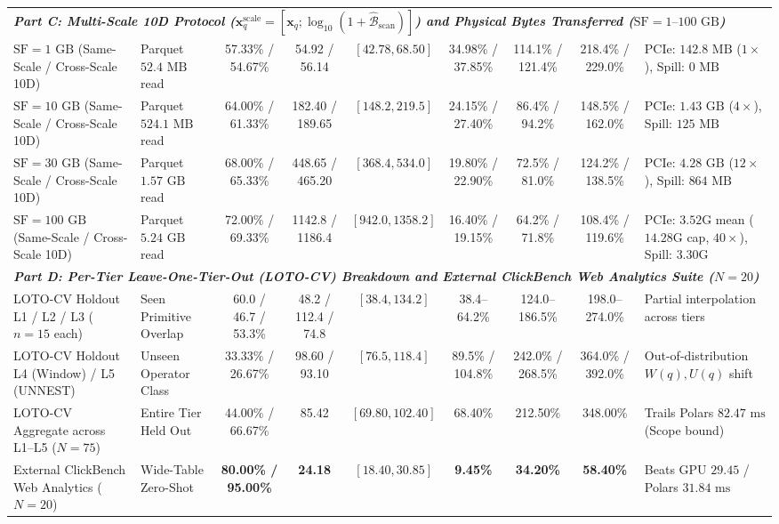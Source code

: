 \documentclass[10pt,a4paper]{article}
\newenvironment{fitasttable}{%
  \begin{lrbox}{\asttblbox}%
}{%
  \end{lrbox}%
  \sbox{\asttblboxB}{%
    \ifdim\wd\asttblbox>0.96\textwidth
      \resizebox{0.96\textwidth}{!}{\usebox{\asttblbox}}%
    \else
      \usebox{\asttblbox}%
    \fi
  }%
  \ifdim\ht\asttblboxB>0.78\textheight
    \resizebox{!}{0.78\textheight}{\usebox{\asttblboxB}}%
  \else
    \usebox{\asttblboxB}%
  \fi
}
\begin{document}
\begin{table}[t!]
\begin{fitasttable}
\begin{tabular}{@{}llccccccl@{}}
\hline
\multicolumn{9}{l}{\textit{\textbf{Part C: Multi-Scale 10D Protocol ($\mathbf{x}_q^{\text{scale}}=[\mathbf{x}_q; \log_{10}(1+\hat{\mathcal{B}}_{\text{scan}})]$) and Physical Bytes Transferred ($\text{SF}=1\text{--}100\text{ GB}$)}}} \\
$\text{SF}=1\text{ GB}$ (Same-Scale / Cross-Scale 10D) & Parquet $52.4\text{ MB}$ read & 57.33\% / 54.67\% & 54.92 / 56.14 & $[42.78, 68.50]$ & 34.98\% / 37.85\% & 114.1\% / 121.4\% & 218.4\% / 229.0\% & PCIe: $142.8\text{ MB}$ ($1\times$), Spill: $0\text{ MB}$ \\
$\text{SF}=10\text{ GB}$ (Same-Scale / Cross-Scale 10D) & Parquet $524.1\text{ MB}$ read & 64.00\% / 61.33\% & 182.40 / 189.65 & $[148.2, 219.5]$ & 24.15\% / 27.40\% & 86.4\% / 94.2\% & 148.5\% / 162.0\% & PCIe: $1.43\text{ GB}$ ($4\times$), Spill: $125\text{ MB}$ \\
$\text{SF}=30\text{ GB}$ (Same-Scale / Cross-Scale 10D) & Parquet $1.57\text{ GB}$ read & 68.00\% / 65.33\% & 448.65 / 465.20 & $[368.4, 534.0]$ & 19.80\% / 22.90\% & 72.5\% / 81.0\% & 124.2\% / 138.5\% & PCIe: $4.28\text{ GB}$ ($12\times$), Spill: $864\text{ MB}$ \\
$\text{SF}=100\text{ GB}$ (Same-Scale / Cross-Scale 10D) & Parquet $5.24\text{ GB}$ read & 72.00\% / 69.33\% & 1142.8 / 1186.4 & $[942.0, 1358.2]$ & 16.40\% / 19.15\% & 64.2\% / 71.8\% & 108.4\% / 119.6\% & PCIe: $3.52\text{G}$ mean ($14.28\text{G}$ cap, $40\times$), Spill: $3.30\text{G}$ \\
\hline
\multicolumn{9}{l}{\textit{\textbf{Part D: Per-Tier Leave-One-Tier-Out (LOTO-CV) Breakdown and External ClickBench Web Analytics Suite ($N=20$)}}} \\
LOTO-CV Holdout L1 / L2 / L3 ($n=15$ each) & Seen Primitive Overlap & 60.0 / 46.7 / 53.3\% & 48.2 / 112.4 / 74.8 & $[38.4, 134.2]$ & 38.4--64.2\% & 124.0--186.5\% & 198.0--274.0\% & Partial interpolation across tiers \\
LOTO-CV Holdout L4 (Window) / L5 (UNNEST) & Unseen Operator Class & 33.33\% / 26.67\% & 98.60 / 93.10 & $[76.5, 118.4]$ & 89.5\% / 104.8\% & 242.0\% / 268.5\% & 364.0\% / 392.0\% & Out-of-distribution $W(q), U(q)$ shift \\
LOTO-CV Aggregate across L1--L5 ($N=75$) & Entire Tier Held Out & 44.00\% / 66.67\% & 85.42 & $[69.80, 102.40]$ & 68.40\% & 212.50\% & 348.00\% & Trails Polars $82.47\text{ ms}$ (Scope bound) \\
External ClickBench Web Analytics ($N=20$) & Wide-Table Zero-Shot & \textbf{80.00\% / 95.00\%} & \textbf{24.18} & $[18.40, 30.85]$ & \textbf{9.45\%} & \textbf{34.20\%} & \textbf{58.40\%} & Beats GPU $29.45$ / Polars $31.84\text{ ms}$ \\

\end{tabular}
\end{fitasttable}
\end{table}
\end{document}
